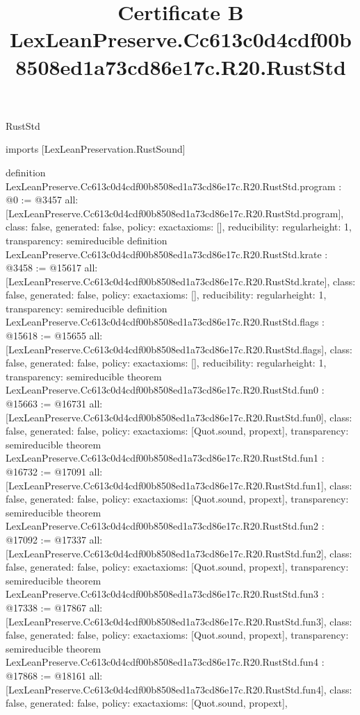 \begin{lexlean}{RustStd}
\title{Certificate B LexLeanPreserve.Cc613c0d4cdf00b8508ed1a73cd86e17c.R20.RustStd}
\begin{coremodule}
imports [LexLeanPreservation.RustSound]

definition LexLeanPreserve.Cc613c0d4cdf00b8508ed1a73cd86e17c.R20.RustStd.program : @0 := @3457 {
  all: [LexLeanPreserve.Cc613c0d4cdf00b8508ed1a73cd86e17c.R20.RustStd.program],
  class: false,
  generated: false,
  policy: exact{axioms: []},
  reducibility: regular{height: 1},
  transparency: semireducible
}
definition LexLeanPreserve.Cc613c0d4cdf00b8508ed1a73cd86e17c.R20.RustStd.krate : @3458 := @15617 {
  all: [LexLeanPreserve.Cc613c0d4cdf00b8508ed1a73cd86e17c.R20.RustStd.krate],
  class: false,
  generated: false,
  policy: exact{axioms: []},
  reducibility: regular{height: 1},
  transparency: semireducible
}
definition LexLeanPreserve.Cc613c0d4cdf00b8508ed1a73cd86e17c.R20.RustStd.flags : @15618 := @15655 {
  all: [LexLeanPreserve.Cc613c0d4cdf00b8508ed1a73cd86e17c.R20.RustStd.flags],
  class: false,
  generated: false,
  policy: exact{axioms: []},
  reducibility: regular{height: 1},
  transparency: semireducible
}
theorem LexLeanPreserve.Cc613c0d4cdf00b8508ed1a73cd86e17c.R20.RustStd.fun0 : @15663 := @16731 {
  all: [LexLeanPreserve.Cc613c0d4cdf00b8508ed1a73cd86e17c.R20.RustStd.fun0],
  class: false,
  generated: false,
  policy: exact{axioms: [Quot.sound, propext]},
  transparency: semireducible
}
theorem LexLeanPreserve.Cc613c0d4cdf00b8508ed1a73cd86e17c.R20.RustStd.fun1 : @16732 := @17091 {
  all: [LexLeanPreserve.Cc613c0d4cdf00b8508ed1a73cd86e17c.R20.RustStd.fun1],
  class: false,
  generated: false,
  policy: exact{axioms: [Quot.sound, propext]},
  transparency: semireducible
}
theorem LexLeanPreserve.Cc613c0d4cdf00b8508ed1a73cd86e17c.R20.RustStd.fun2 : @17092 := @17337 {
  all: [LexLeanPreserve.Cc613c0d4cdf00b8508ed1a73cd86e17c.R20.RustStd.fun2],
  class: false,
  generated: false,
  policy: exact{axioms: [Quot.sound, propext]},
  transparency: semireducible
}
theorem LexLeanPreserve.Cc613c0d4cdf00b8508ed1a73cd86e17c.R20.RustStd.fun3 : @17338 := @17867 {
  all: [LexLeanPreserve.Cc613c0d4cdf00b8508ed1a73cd86e17c.R20.RustStd.fun3],
  class: false,
  generated: false,
  policy: exact{axioms: [Quot.sound, propext]},
  transparency: semireducible
}
theorem LexLeanPreserve.Cc613c0d4cdf00b8508ed1a73cd86e17c.R20.RustStd.fun4 : @17868 := @18161 {
  all: [LexLeanPreserve.Cc613c0d4cdf00b8508ed1a73cd86e17c.R20.RustStd.fun4],
  class: false,
  generated: false,
  policy: exact{axioms: [Quot.sound, propext]},
}
\end{coremodule}
\end{lexlean}
